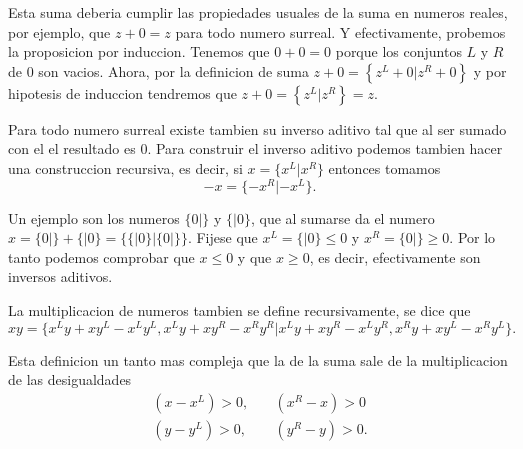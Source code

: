     Esta suma deberia cumplir las propiedades usuales de la suma en numeros reales, por ejemplo, que $z+0=z$ para todo numero surreal. Y efectivamente, probemos la proposicion por induccion. Tenemos que $0+0 = 0$ porque los conjuntos $L$ y $R$ de $0$ son vacios. Ahora, por la definicion de suma $z+0 = \left\{z^L+0|z^R+0\right\}$ y por hipotesis de induccion tendremos que $z+0 = \left\{z^L|z^R\right\} = z$.

    Para todo numero surreal existe tambien su inverso aditivo tal que al ser sumado con el el resultado es $0$. Para construir el inverso aditivo podemos tambien hacer una construccion recursiva, es decir, si $x=\{x^L|x^R\}$ entonces tomamos 
    \[
        -x = \{-x^R|-x^L\}.
    \]

    Un ejemplo son los numeros $\{0|\}$ y $\{|0\}$, que al sumarse da el numero $x = \{0|\} + \{|0\} = \{\{|0\}|\{0|\}\}$. Fijese que $x^L = \{|0\}\le 0$ y $x^R = \{0|\}\ge 0$. Por lo tanto podemos comprobar que $x\le 0$ y que $x \ge 0$, es decir, efectivamente son inversos aditivos.

    La multiplicacion de numeros tambien se define recursivamente, se dice que
    \[
        xy = \{x^Ly+xy^L-x^Ly^L, x^Ly+xy^R-x^Ry^R| x^Ly+xy^R-x^Ly^R, x^Ry+xy^L-x^Ry^L\}.
    \]

    Esta definicion un tanto mas compleja que la de la suma sale de la multiplicacion de las desigualdades
    \begin{align*}
        (x-x^L) > 0, \quad & (x^R-x)>0 \\
        (y-y^L) > 0, \quad & (y^R-y)>0.
    \end{align*}
    